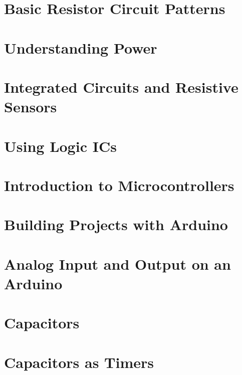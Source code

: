 \documentclass[twocolumn]{book}
\begin{document}


\chapter{Basic Resistor Circuit Patterns}



\chapter{Understanding Power}



\chapter{Integrated Circuits and Resistive Sensors}



\chapter{Using Logic ICs}



\chapter{Introduction to Microcontrollers}



\chapter{Building Projects with Arduino}



\chapter{Analog Input and Output on an Arduino}



\chapter{Capacitors}



\chapter{Capacitors as Timers}
\end{document}
